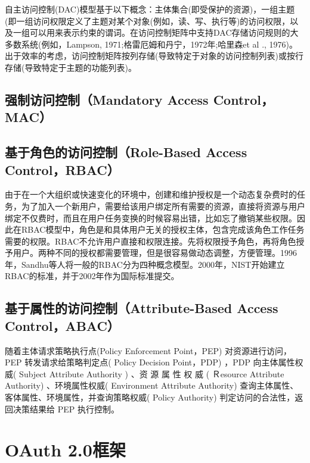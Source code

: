 自主访问控制(DAC)模型基于以下概念：主体集合(即受保护的资源)，一组主题(即一组访问权限定义了主题对某个对象(例如，读、写、执行等)的访问权限，以及一组可以用来表示约束的谓词。在访问控制矩阵中支持DAC存储访问规则的大多数系统(例如，Lampson, 1971;格雷厄姆和丹宁，1972年;哈里森et al ., 1976)。出于效率的考虑，访问控制矩阵按列存储(导致特定于对象的访问控制列表)或按行存储(导致特定于主题的功能列表)。

\subsection{强制访问控制（Mandatory Access Control，MAC）}

\subsection{基于角色的访问控制（Role-Based Access Control，RBAC）}

由于在一个大组织或快速变化的环境中，创建和维护授权是一个动态复杂费时的任务，为了加入一个新用户，需要给该用户绑定所有需要的资源，直接将资源与用户绑定不仅费时，而且在用户任务变换的时候容易出错，比如忘了撤销某些权限。因此在RBAC模型中，角色是和具体用户无关的授权主体，包含完成该角色工作任务需要的权限。RBAC不允许用户直接和权限连接。先将权限授予角色，再将角色授予用户。两种不同的授权都需要管理，但是很容易做动态调整，方便管理。1996年，Sandhu等人将一般的RBAC分为四种概念模型。2000年，NIST开始建立RBAC的标准，并于2002年作为国际标准提交。

\subsection{基于属性的访问控制（Attribute-Based Access Control，ABAC）}

随着主体请求策略执行点(Policy Enforcement Point，PEP) 对资源进行访问，PEP 转发请求给策略判定点( Policy Decision Point，PDP) ，PDP 向主体属性权威( Subject Attribute Authority ) 、资 源 属 性 权 威 ( Ｒesource Attribute Authority) 、环境属性权威( Environment Attribute Authority) 查询主体属性、客体属性、环境属性，并查询策略权威( Policy Authority) 判定访问的合法性，返回决策结果给 PEP 执行控制。


\section{OAuth 2.0框架}

